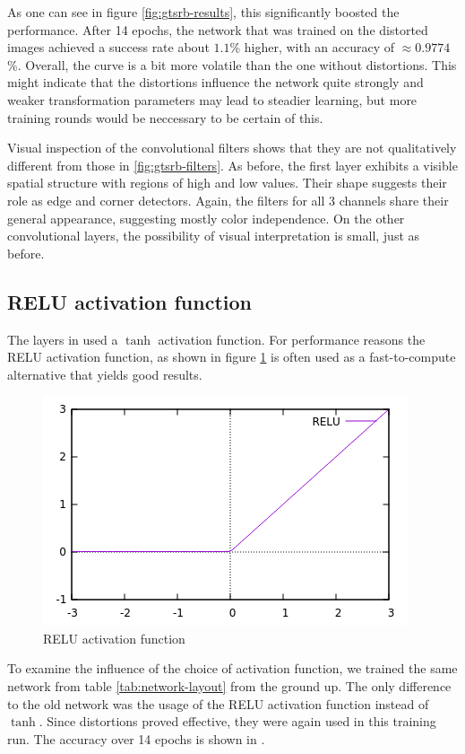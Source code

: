 \documentclass[11pt, a4paper]{article}
\begin{document}
As one can see in figure \ref{fig:gtsrb-results}, this significantly boosted the performance. After 14 epochs, the network that was trained on the distorted images achieved a success rate about $1.1$\% higher, with an accuracy of $\approx 0.9774$\%. Overall, the curve is a bit more volatile than the one without distortions. This might indicate that the distortions influence the network quite strongly and weaker transformation parameters may lead to steadier learning, but more training rounds would be neccessary to be certain of this.

Visual inspection of the convolutional filters shows that they are not qualitatively different from those in \ref{fig:gtsrb-filters}. As before, the first layer exhibits a visible spatial structure with regions of high and low values. Their shape suggests their role as edge and corner detectors. Again, the filters for all 3 channels share their general appearance, suggesting mostly color independence. On the other convolutional layers, the possibility of visual interpretation is small, just as before.

\subsection{RELU activation function}
The layers in \cite{multi-column-neural-network-gtsrb} used a $\tanh$ activation function. For performance reasons the RELU activation function, as shown in figure \ref{fig:relu} is often used as a fast-to-compute alternative that yields good results.

\begin{figure}[h!!!]
	\centering
	\includegraphics{images/relu.png}
	\caption{RELU activation function}
	\label{fig:relu}
\end{figure}

To examine the influence of the choice of activation function, we trained the same network from table \ref{tab:network-layout} from the ground up. The only difference to the old network was the usage of the RELU activation function instead of $\tanh$. Since distortions proved effective, they were again used in this training run. The accuracy over 14 epochs is shown in .
\end{document}
